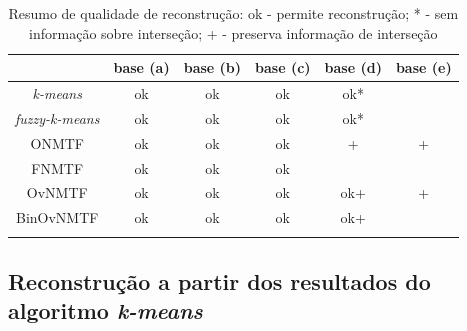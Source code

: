 \documentclass[
    12pt,                %
    oneside,            %
    a4paper,            %
    english,            %
    brazil                %
    ]{abntex2ppgsi}
\begin{document}
\begin{table}[htpb]
\centering
    \caption{Resumo de qualidade de reconstrução: ok - permite reconstrução; * - sem informação sobre interseção; + - preserva informação de interseção}
        \begin{tabular}{cccccc}
            \hline
            & \textbf{base (a)} & \textbf{base (b)} & \textbf{base (c)} & \textbf{base (d) }& \textbf{base (e)} \\
            \hline
            \textit{k-means}       & ok & ok & ok & ok*  &  \\
            \textit{  fuzzy-k-means} & ok & ok & ok & ok*  &  \\
            ONMTF         & ok & ok & ok & +    & +  \\
            FNMTF         & ok & ok & ok &    &  \\
            OvNMTF        & ok & ok & ok & ok+  & + \\
            BinOvNMTF     & ok & ok & ok & ok+  &  \\
            \hline
             & & & & &  \\
        \end{tabular}
    \label{tab:resumoREC}
\end{table}



\subsection{Reconstrução a partir dos resultados do algoritmo \textit{k-means}}
\label{subsec:results-reconstruction-kmeans}
\end{document}

